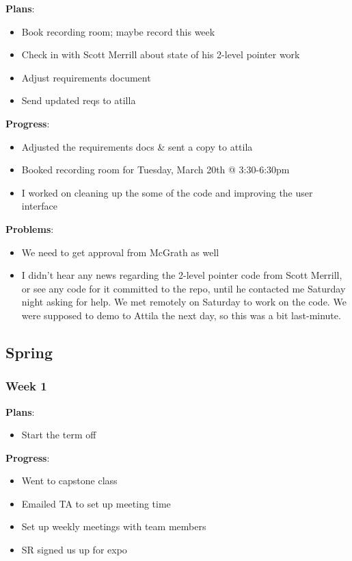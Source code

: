 \noindent \textbf{Plans}:
\begin{itemize}
\item Book recording room; maybe record this week 
\item Check in with Scott Merrill about state of his 2-level pointer work 
\item Adjust requirements document 
\item Send updated reqs to atilla 
\end{itemize}

\noindent \textbf{Progress}:

\begin{itemize}
\item Adjusted the requirements docs \& sent a copy to attila 
\item Booked recording room for Tuesday, March 20th @ 3:30-6:30pm 
\item I worked on cleaning up the some of the code and improving the user interface  
\end{itemize}

\noindent \textbf{Problems}:

\begin{itemize}
\item We need to get approval from McGrath as well 
\item I didn't hear any news regarding the 2-level pointer code from Scott Merrill, or see any code for it committed to the repo, until he contacted me Saturday night asking for help. We met remotely on Saturday to work on the code. We were supposed to demo to Attila the next day, so this was a bit last-minute.
\end{itemize}

\subsection{Spring}
\subsubsection{Week 1}

\noindent \textbf{Plans}:

\begin{itemize}
\item Start the term off 
\end{itemize}

\noindent \textbf{Progress}:

\begin{itemize}
\item Went to capstone class 
\item Emailed TA to set up meeting time 
\item Set up weekly meetings with team members 
\item SR signed us up for expo 
\end{itemize}

